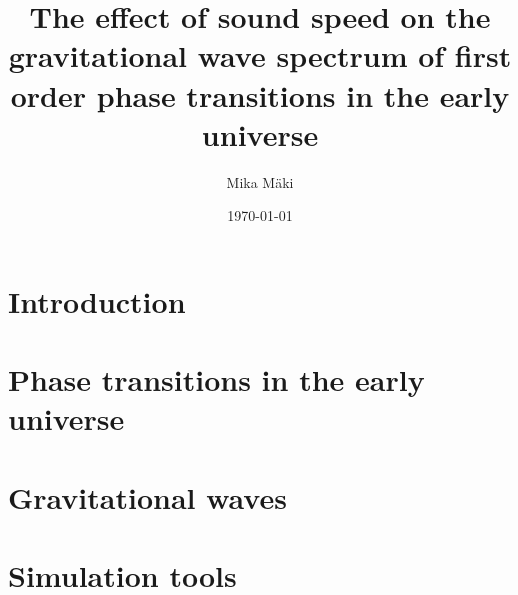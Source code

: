 \documentclass[english,twoside,openright]{UH_TCM_MSc}
\title{The effect of sound speed on the gravitational wave spectrum of first order phase transitions in the early universe}
\author{Mika Mäki}
\date{\today}
\begin{document}
\maketitle


\begin{abstract}

\end{abstract}

\mytableofcontents

\mynomenclature

\clearpage
\listoffigures
\clearpage
\listoftables
\clearpage

\listoftodos
\clearpage

% 

\chapter{Introduction}
\label{ch:introduction}


\chapter{Phase transitions in the early universe}
\label{ch:pt}











\chapter{Gravitational waves}
\label{ch:gw}


\chapter{Simulation tools}
\label{ch:simulation}

\end{document}
